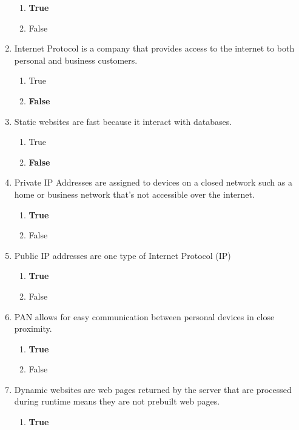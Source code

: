 \documentclass{article}
\begin{document}
\begin{enumerate}[label=\arabic*.]
          \begin{enumerate}
              \item \textbf{True}
              \item False
          \end{enumerate}
    \item Internet Protocol is a company that provides access to the internet to both personal and business customers.
          \begin{enumerate}
              \item True
              \item \textbf{False}
          \end{enumerate}
    \item Static websites are fast because it interact with databases.
          \begin{enumerate}
              \item True
              \item \textbf{False}
          \end{enumerate}
    \item Private IP Addresses are assigned to devices on a closed network such as a home or business network that's not accessible over the internet.
          \begin{enumerate}
              \item \textbf{True}
              \item False
          \end{enumerate}
    \item Public IP addresses are one type of Internet Protocol (IP)
          \begin{enumerate}
              \item \textbf{True}
              \item False
          \end{enumerate}
    \item PAN allows for easy communication between personal devices in close proximity.
            \begin{enumerate}
                \item \textbf{True}
                \item False
            \end{enumerate}
    \item Dynamic websites are web pages returned by the server that are processed during runtime means they are not prebuilt web pages.
            \begin{enumerate}
                \item \textbf{True}

\end{enumerate}
\end{enumerate}
\end{document}
